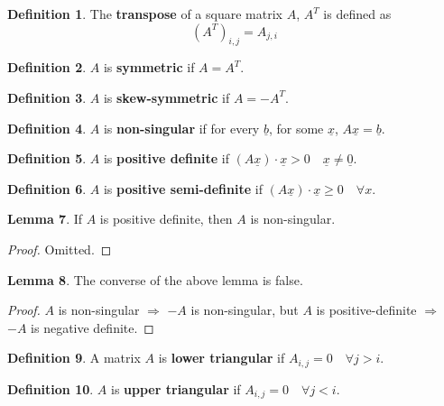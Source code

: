 \documentclass[12pt,a4paper]{article}
\theoremstyle{definition}
\newtheorem{definition}{Definition}[subsection]
\newtheorem{lemma}[definition]{Lemma}
\begin{document}
\begin{definition}
	The \textbf{transpose} of a square matrix $A$, $A^T$ is defined as
	\[
		{(A^T)}_{i, j} = A_{j, i}
	\]
\end{definition}

\begin{definition}
	$A$ is \textbf{symmetric} if $A = A^T$.
\end{definition}

\begin{definition}
	$A$ is \textbf{skew-symmetric} if $A = -A^T$.
\end{definition}

\begin{definition}
	$A$ is \textbf{non-singular} if for every $\underline{b}$, for some $\underline{x}$, $A\underline{x} = \underline{b}$.
\end{definition}

\begin{definition}
	$A$ is \textbf{positive definite} if $(A \underline{x}) \cdot \underline{x} > 0 \quad \underline{x} \ne \underline{0}$.
\end{definition}

\begin{definition}
	$A$ is \textbf{positive semi-definite} if $(A \underline{x}) \cdot \underline{x} \ge 0 \quad \forall x$.
\end{definition}

\begin{lemma}
	If $A$ is positive definite, then $A$ is non-singular.
\end{lemma}

\begin{proof}
	Omitted.
\end{proof}

\begin{lemma}
	The converse of the above lemma is false.
\end{lemma}

\begin{proof}
	$A$ is non-singular $\Rightarrow$ $-A$ is non-singular, but $A$ is positive-definite $\Rightarrow$ $-A$ is negative definite.
\end{proof}

\begin{definition}
	A matrix $A$ is \textbf{lower triangular} if $A_{i, j} = 0 \quad \forall j > i$.
\end{definition}

\begin{definition}
	$A$ is \textbf{upper triangular} if $A_{i, j} = 0 \quad \forall j < i$.
\end{definition}
\end{document}
